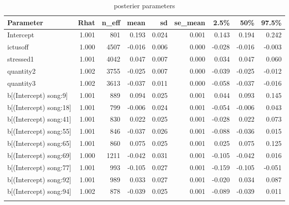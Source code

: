 \begin{longtable}{lrrrrrrrr}
  \toprule
Parameter & Rhat & n\_eff & mean & sd & se\_mean & 2.5\% & 50\% & 97.5\% \\ 
  \midrule
Intercept & 1.001 &  801 & 0.193 & 0.024 & 0.001 & 0.143 & 0.194 & 0.242 \\ 
  ictusoff & 1.000 & 4507 & -0.016 & 0.006 & 0.000 & -0.028 & -0.016 & -0.003 \\ 
  stressed1 & 1.001 & 4042 & 0.047 & 0.007 & 0.000 & 0.034 & 0.047 & 0.060 \\ 
  quantity2 & 1.002 & 3755 & -0.025 & 0.007 & 0.000 & -0.039 & -0.025 & -0.012 \\ 
  quantity3 & 1.002 & 3613 & -0.037 & 0.011 & 0.000 & -0.058 & -0.037 & -0.016 \\ 
  b[(Intercept) song:9] & 1.001 &  889 & 0.094 & 0.025 & 0.001 & 0.044 & 0.093 & 0.145 \\ 
  b[(Intercept) song:18] & 1.001 &  799 & -0.006 & 0.024 & 0.001 & -0.054 & -0.006 & 0.043 \\ 
  b[(Intercept) song:41] & 1.001 &  830 & 0.022 & 0.025 & 0.001 & -0.028 & 0.022 & 0.073 \\ 
  b[(Intercept) song:55] & 1.001 &  846 & -0.037 & 0.026 & 0.001 & -0.088 & -0.036 & 0.015 \\ 
  b[(Intercept) song:65] & 1.001 &  860 & 0.075 & 0.025 & 0.001 & 0.025 & 0.075 & 0.125 \\ 
  b[(Intercept) song:69] & 1.000 & 1211 & -0.042 & 0.031 & 0.001 & -0.105 & -0.042 & 0.016 \\ 
  b[(Intercept) song:77] & 1.001 &  993 & -0.105 & 0.027 & 0.001 & -0.159 & -0.105 & -0.051 \\ 
  b[(Intercept) song:92] & 1.001 &  989 & 0.033 & 0.027 & 0.001 & -0.020 & 0.034 & 0.087 \\ 
  b[(Intercept) song:94] & 1.002 &  878 & -0.039 & 0.025 & 0.001 & -0.089 & -0.039 & 0.011 \\ 
   \bottomrule
\caption{posterier parameters} 
\end{longtable}



